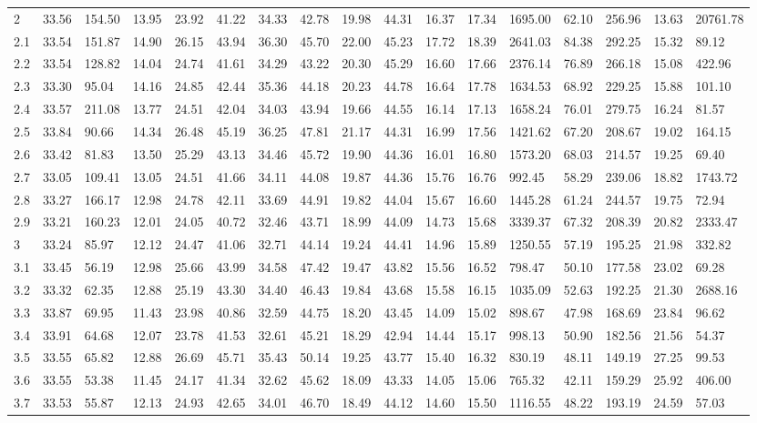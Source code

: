 \begin{adjustbox}{angle=90}
\begin{center}
{\begin{tabular}{|l|llllllllllllllll|}
2&33.56&154.50&13.95&23.92&41.22&34.33&42.78&19.98&44.31&16.37&17.34&1695.00&62.10&256.96&13.63&20761.78  \\ 
2.1&33.54&151.87&14.90&26.15&43.94&36.30&45.70&22.00&45.23&17.72&18.39&2641.03&84.38&292.25&15.32&89.12  \\ 
2.2&33.54&128.82&14.04&24.74&41.61&34.29&43.22&20.30&45.29&16.60&17.66&2376.14&76.89&266.18&15.08&422.96  \\ 
2.3&33.30&95.04&14.16&24.85&42.44&35.36&44.18&20.23&44.78&16.64&17.78&1634.53&68.92&229.25&15.88&101.10  \\ 
2.4&33.57&211.08&13.77&24.51&42.04&34.03&43.94&19.66&44.55&16.14&17.13&1658.24&76.01&279.75&16.24&81.57  \\ 
2.5&33.84&90.66&14.34&26.48&45.19&36.25&47.81&21.17&44.31&16.99&17.56&1421.62&67.20&208.67&19.02&164.15  \\ 
2.6&33.42&81.83&13.50&25.29&43.13&34.46&45.72&19.90&44.36&16.01&16.80&1573.20&68.03&214.57&19.25&69.40  \\ 
2.7&33.05&109.41&13.05&24.51&41.66&34.11&44.08&19.87&44.36&15.76&16.76&992.45&58.29&239.06&18.82&1743.72  \\ 
2.8&33.27&166.17&12.98&24.78&42.11&33.69&44.91&19.82&44.04&15.67&16.60&1445.28&61.24&244.57&19.75&72.94  \\ 
2.9&33.21&160.23&12.01&24.05&40.72&32.46&43.71&18.99&44.09&14.73&15.68&3339.37&67.32&208.39&20.82&2333.47  \\ 
3&33.24&85.97&12.12&24.47&41.06&32.71&44.14&19.24&44.41&14.96&15.89&1250.55&57.19&195.25&21.98&332.82  \\ 
3.1&33.45&56.19&12.98&25.66&43.99&34.58&47.42&19.47&43.82&15.56&16.52&798.47&50.10&177.58&23.02&69.28  \\ 
3.2&33.32&62.35&12.88&25.19&43.30&34.40&46.43&19.84&43.68&15.58&16.15&1035.09&52.63&192.25&21.30&2688.16  \\ 
3.3&33.87&69.95&11.43&23.98&40.86&32.59&44.75&18.20&43.45&14.09&15.02&898.67&47.98&168.69&23.84&96.62  \\ 
3.4&33.91&64.68&12.07&23.78&41.53&32.61&45.21&18.29&42.94&14.44&15.17&998.13&50.90&182.56&21.56&54.37  \\ 
3.5&33.55&65.82&12.88&26.69&45.71&35.43&50.14&19.25&43.77&15.40&16.32&830.19&48.11&149.19&27.25&99.53  \\ 
3.6&33.55&53.38&11.45&24.17&41.34&32.62&45.62&18.09&43.33&14.05&15.06&765.32&42.11&159.29&25.92&406.00  \\ 
3.7&33.53&55.87&12.13&24.93&42.65&34.01&46.70&18.49&44.12&14.60&15.50&1116.55&48.22&193.19&24.59&57.03  \\ 

\end{tabular}}
\end{center}
\end{adjustbox}

